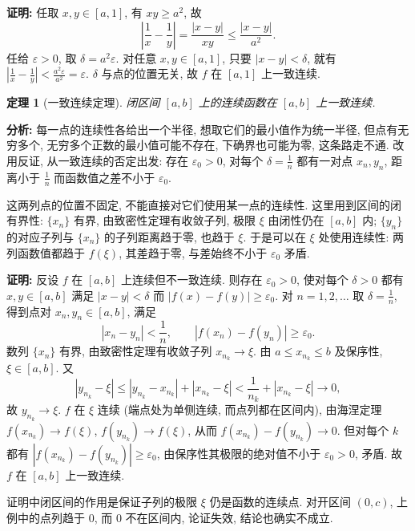 \documentclass[UTF8,openany]{ctexbook}
\theoremstyle{chinesetextbook}
\newtheorem{theorem}{定理}[section]
\newenvironment{cnproof}{\par\indent\textbf{证明:} \ignorespaces}{\par}
\begin{document}
\begin{cnproof}
任取 $x,y\in[a,1]$, 有 $xy\ge a^2$, 故
\[
\left|\frac1x-\frac1y\right|=\frac{|x-y|}{xy}\le\frac{|x-y|}{a^2}.
\]
任给 $\varepsilon>0$, 取 $\delta=a^2\varepsilon$. 对任意 $x,y\in[a,1]$, 只要 $|x-y|<\delta$, 就有 $\displaystyle\left|\frac1x-\frac1y\right|<\frac{a^2\varepsilon}{a^2}=\varepsilon$. $\delta$ 与点的位置无关, 故 $f$ 在 $[a,1]$ 上一致连续.
\end{cnproof}
\begin{theorem}[一致连续定理]
闭区间 $[a,b]$ 上的连续函数在 $[a,b]$ 上一致连续.
\end{theorem}
\par\indent\textbf{分析:} 每一点的连续性各给出一个半径, 想取它们的最小值作为统一半径, 但点有无穷多个, 无穷多个正数的最小值可能不存在, 下确界也可能为零, 这条路走不通. 改用反证, 从一致连续的否定出发: 存在 $\varepsilon_0>0$, 对每个 $\displaystyle\delta=\frac1n$ 都有一对点 $x_n,y_n$, 距离小于 $\displaystyle\frac1n$ 而函数值之差不小于 $\varepsilon_0$.

这两列点的位置不固定, 不能直接对它们使用某一点的连续性. 这里用到区间的闭有界性: $\{x_n\}$ 有界, 由致密性定理有收敛子列, 极限 $\xi$ 由闭性仍在 $[a,b]$ 内; $\{y_n\}$ 的对应子列与 $\{x_n\}$ 的子列距离趋于零, 也趋于 $\xi$. 于是可以在 $\xi$ 处使用连续性: 两列函数值都趋于 $f(\xi)$, 其差趋于零, 与差始终不小于 $\varepsilon_0$ 矛盾.
\begin{cnproof}
反设 $f$ 在 $[a,b]$ 上连续但不一致连续. 则存在 $\varepsilon_0>0$, 使对每个 $\delta>0$ 都有 $x,y\in[a,b]$ 满足 $|x-y|<\delta$ 而 $|f(x)-f(y)|\ge\varepsilon_0$. 对 $n=1,2,\ldots$ 取 $\displaystyle\delta=\frac1n$, 得到点对 $x_n,y_n\in[a,b]$, 满足
\[
|x_n-y_n|<\frac1n,\qquad |f(x_n)-f(y_n)|\ge\varepsilon_0.
\]
数列 $\{x_n\}$ 有界, 由致密性定理有收敛子列 $x_{n_k}\to\xi$. 由 $a\le x_{n_k}\le b$ 及保序性, $\xi\in[a,b]$. 又
\[
|y_{n_k}-\xi|\le|y_{n_k}-x_{n_k}|+|x_{n_k}-\xi|<\frac1{n_k}+|x_{n_k}-\xi|\to0,
\]
故 $y_{n_k}\to\xi$. $f$ 在 $\xi$ 连续 (端点处为单侧连续, 而点列都在区间内), 由海涅定理 $f(x_{n_k})\to f(\xi)$, $f(y_{n_k})\to f(\xi)$, 从而 $f(x_{n_k})-f(y_{n_k})\to0$. 但对每个 $k$ 都有 $|f(x_{n_k})-f(y_{n_k})|\ge\varepsilon_0$, 由保序性其极限的绝对值不小于 $\varepsilon_0>0$, 矛盾. 故 $f$ 在 $[a,b]$ 上一致连续.
\end{cnproof}
证明中闭区间的作用是保证子列的极限 $\xi$ 仍是函数的连续点. 对开区间 $(0,c)$, 上例中的点列趋于 $0$, 而 $0$ 不在区间内, 论证失效, 结论也确实不成立.
\end{document}
